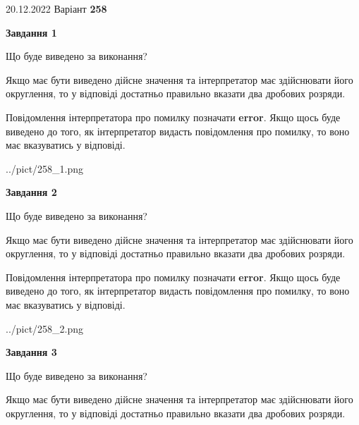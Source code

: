 \documentclass[12pt, ukrainian]{article}
\begin{document}
{20.12.2022 Варіант \No \textbf { 258 }\par}
{
\begin {Large}

{\begin {center}\textbf{Завдання 1}\end {center}}\par
Що буде виведено за виконання? \par

Якщо має бути виведено дійсне значення та інтерпретатор має здійснювати його округлення, 
то у відповіді достатньо правильно вказати два дробових розряди.

Повідомлення інтерпретатора про помилку позначати \textbf{error}.
Якщо щось буде виведено до того, як інтерпретатор видасть повідомлення про помилку, 
то воно має вказуватись у відповіді. \par

\begin{center}
	{../pict/258_1.png}
\end{center}
\newpage

{\begin {center}\textbf{Завдання 2}\end {center}}\par
Що буде виведено за виконання? \par

Якщо має бути виведено дійсне значення та інтерпретатор має здійснювати його округлення, 
то у відповіді достатньо правильно вказати два дробових розряди.

Повідомлення інтерпретатора про помилку позначати \textbf{error}.
Якщо щось буде виведено до того, як інтерпретатор видасть повідомлення про помилку, 
то воно має вказуватись у відповіді. \par

\begin{center}
	{../pict/258_2.png}
\end{center}
\newpage

{\begin {center}\textbf{Завдання 3}\end {center}}\par
Що буде виведено за виконання? \par

Якщо має бути виведено дійсне значення та інтерпретатор має здійснювати його округлення, 
то у відповіді достатньо правильно вказати два дробових розряди.


\end{Large}}
\end{document}
